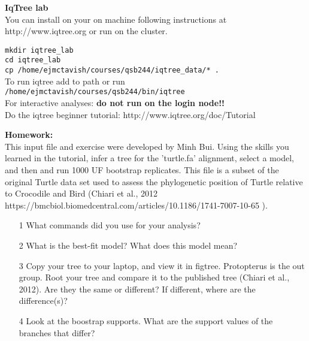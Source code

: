 \documentclass{beamer}
\begin{document}
\begin{frame}
\textbf{IqTree lab}\\
You can install on your on machine following instructions at http://www.iqtree.org
or run on the cluster.

\texttt{mkdir iqtree\_lab}\\
\texttt{cd iqtree\_lab}\\
\texttt{cp /home/ejmctavish/courses/qsb244/iqtree\_data/* .}\\
\medskip
To run iqtree add to path or run
\texttt{/home/ejmctavish/courses/qsb244/bin/iqtree}\\


\medskip
For interactive analyses:
\url{} 
\textbf{do not run on the login node!!}\\


\medskip
Do the iqtree beginner tutorial: 
http://www.iqtree.org/doc/Tutorial


 
\end{frame}

\begin{frame}

\textbf{Homework:}\\
This input file and exercise were developed by Minh Bui.
Using the skills you learned in the tutorial, infer a tree for the 'turtle.fa' alignment, select a model, and then and run 1000 UF bootstrap replicates. 
This file is a subset of the original Turtle data set used to assess the phylogenetic position of Turtle relative to Crocodile and Bird (Chiari et al., 2012 https://bmcbiol.biomedcentral.com/articles/10.1186/1741-7007-10-65 ).
     \begin{itemize}
      \item[1] What commands did you use for your analysis?
      \item[2] What is the best-fit model? What does this model mean?
      \item[3] Copy your tree to your laptop, and view it in figtree. Protopterus is the out group. Root your tree and compare it to the published tree (Chiari et al., 2012). Are they the same or different? If different, where are the difference(s)?
      \item[4] Look at the boostrap supports. What are the support values of the branches that differ?
      
      
     \end{itemize}

        
\end{frame}
\end{document}

